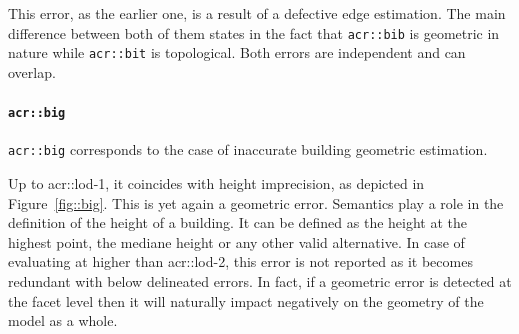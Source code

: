                 This error, as the earlier one, is a result of a defective edge estimation.
                The main difference between both of them states in the fact that \texttt{\gls{acr::bib}} is geometric in nature while \texttt{\gls{acr::bit}} is topological.
                Both errors are independent and can overlap.

            \paragraph{\texttt{\acrlong*{acr::big}}}
                \texttt{\gls{acr::big}} corresponds to the case of inaccurate building geometric estimation.

                \begin{figure}[htbp]
                    \centering
                \end{figure}

                Up to \gls{acr::lod}-1, it coincides with height imprecision, as depicted in Figure~\ref{fig::big}.
                This is yet again a geometric error.
                Semantics play a role in the definition of the height of a building.
                It can be defined as the height at the highest point, the mediane height or any other valid alternative.
                In case of evaluating at higher than \gls{acr::lod}-2, this error is not reported as it becomes redundant with below delineated errors.
                In fact, if a geometric error is detected at the facet level then it will naturally impact negatively on the geometry of the model as a whole.
            
